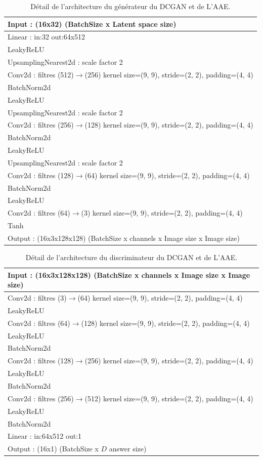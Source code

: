 \documentclass[11pt,francais]{article}
\begin{document}
\begin{appendix}
\begin{table}[h]
  \begin{tabular}{l}
  \hline
  Input : (16x32) (BatchSize x Latent space size) \tabularnewline
  \hline
  \hline
  Linear : in:32 out:64x512\tabularnewline
  LeakyReLU\tabularnewline
  \hline
  UpsamplingNearest2d : scale factor 2\tabularnewline
  Conv2d : filtres (512)\(\rightarrow\)(256) kernel size=(9, 9), stride=(2, 2), padding=(4, 4) \tabularnewline
  BatchNorm2d\tabularnewline
  LeakyReLU \tabularnewline
  \hline
  UpsamplingNearest2d : scale factor 2\tabularnewline
  Conv2d : filtres (256)\(\rightarrow\)(128) kernel size=(9, 9), stride=(2, 2), padding=(4, 4) \tabularnewline
  BatchNorm2d\tabularnewline
  LeakyReLU \tabularnewline
  \hline
  UpsamplingNearest2d : scale factor 2\tabularnewline
  Conv2d : filtres (128)\(\rightarrow\)(64) kernel size=(9, 9), stride=(2, 2), padding=(4, 4) \tabularnewline
  BatchNorm2d\tabularnewline
  LeakyReLU \tabularnewline
  \hline
  Conv2d : filtres (64)\(\rightarrow\)(3) kernel size=(9, 9), stride=(2, 2), padding=(4, 4) \tabularnewline
  Tanh\tabularnewline
  \hline
  \hline
  Output : (16x3x128x128) (BatchSize x channels x Image size x Image size)\tabularnewline
  \hline
  \end{tabular}
  \label{tab:tab4}
  \caption{Détail de l'architecture du générateur du DCGAN et de L'AAE.}
\end{table}

\begin{table}[h]
  \begin{tabular}{l}
  \hline
  Input : (16x3x128x128) (BatchSize x channels x Image size x Image size) \tabularnewline
  \hline
  \hline
  Conv2d : filtres (3)\(\rightarrow\)(64) kernel size=(9, 9), stride=(2, 2), padding=(4, 4) \tabularnewline
  LeakyReLU \tabularnewline
  \hline
  Conv2d : filtres (64)\(\rightarrow\)(128) kernel size=(9, 9), stride=(2, 2), padding=(4, 4) \tabularnewline
  LeakyReLU \tabularnewline
  BatchNorm2d\tabularnewline
  \hline
  Conv2d : filtres (128)\(\rightarrow\)(256) kernel size=(9, 9), stride=(2, 2), padding=(4, 4) \tabularnewline
  LeakyReLU \tabularnewline
  BatchNorm2d\tabularnewline
  \hline
  Conv2d : filtres (256)\(\rightarrow\)(512) kernel size=(9, 9), stride=(2, 2), padding=(4, 4) \tabularnewline
  LeakyReLU \tabularnewline
  BatchNorm2d\tabularnewline
  \hline
  Linear : in:64x512 out:1\tabularnewline
  \hline
  \hline
  Output : (16x1) (BatchSize x \(D\) answer size)\tabularnewline
  \hline
  \end{tabular}
  \label{tab:tab5}
  \caption{Détail de l'architecture du discriminateur du DCGAN et de L'AAE.}
\end{table}


\end{appendix}
\end{document}
